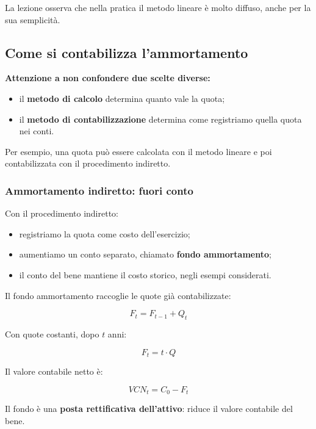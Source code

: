 \noindent La lezione osserva
che nella pratica il metodo lineare
è molto diffuso,
anche per la sua semplicità.


\subsection{Come si contabilizza l'ammortamento}

\noindent \textbf{Attenzione a non confondere
due scelte diverse:}

\begin{itemize}
    \item il \textbf{metodo di calcolo}
    determina quanto vale la quota;

    \item il \textbf{metodo di contabilizzazione}
    determina come registriamo
    quella quota nei conti.
\end{itemize}

\noindent Per esempio,
una quota può essere calcolata
con il metodo lineare
e poi contabilizzata
con il procedimento indiretto.


\subsubsection*{Ammortamento indiretto:
fuori conto}

\noindent Con il procedimento indiretto:

\begin{itemize}
    \item registriamo la quota
    come costo dell'esercizio;

    \item aumentiamo un conto separato,
    chiamato \textbf{fondo ammortamento};

    \item il conto del bene
    mantiene il costo storico,
    negli esempi considerati.
\end{itemize}

\noindent Il fondo ammortamento
raccoglie le quote già contabilizzate:

\[
\boxed{
F_t=F_{t-1}+Q_t
}
\]

\noindent Con quote costanti,
dopo $t$ anni:

\[
\boxed{
F_t=t\cdot Q
}
\]

\noindent Il valore contabile netto è:

\[
\boxed{
VCN_t=C_0-F_t
}
\]

\noindent Il fondo è una
\textbf{posta rettificativa dell'attivo}:
riduce il valore contabile del bene.

